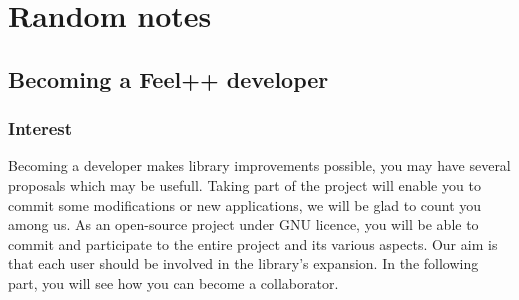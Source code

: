 \chapter{Random notes}
\label{cha:random-notes}

\section{Becoming a Feel++ developer}
\label{feeldevel}
\subsection{Interest}
Becoming a \feel developer makes library improvements possible, you may have several proposals which may be usefull. Taking part of the project will enable you to commit some modifications or new applications, we will be glad to count you among us. As an open-source project under GNU licence,  you will be able to commit and participate to the entire project and its various aspects. Our aim is that each user should be involved in the library's expansion. In the following part, you will see how you can become a \feel collaborator.
 
